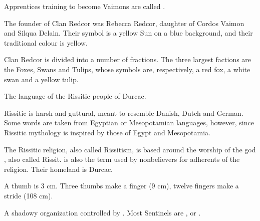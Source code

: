 \begin{gloss}
Apprentices training to become Vaimons are called \neophytes.\index{\neophyte}

The founder of Clan Redcor was Rebecca Redcor, daughter of Cordos Vaimon and Silqua Delain. Their symbol is a yellow Sun on a blue background, and their traditional colour is yellow. 

Clan Redcor is divided into a number of fractions. The three largest factions are the Foxes, Swans and Tulips, whose symbols are, respectively, a red fox, a white swan and a yellow tulip. 



The language of the Rissitic people of Durcac. 

Rissitic is harsh and guttural, meant to resemble Danish, Dutch and German. Some words are taken from Egyptian or Mesopotamian languages, however, since Rissitic mythology is inspired by those of Egypt and Mesopotamia. 



The Rissitic religion, also called Rissitism, is based around the worship of the god \HriistN, also called Rissit.  is also the term used by nonbelievers for adherents of the religion. Their homeland is Durcac. 





A thumb is 3 cm. Three thumbs make a finger (9 cm), twelve fingers make a stride (108 cm).






\seee{\Samur}



A shadowy organization controlled by \dragons{}. Most Sentinels are \dragons, \rachyth{} or \scathae{}. 




\end{gloss}
